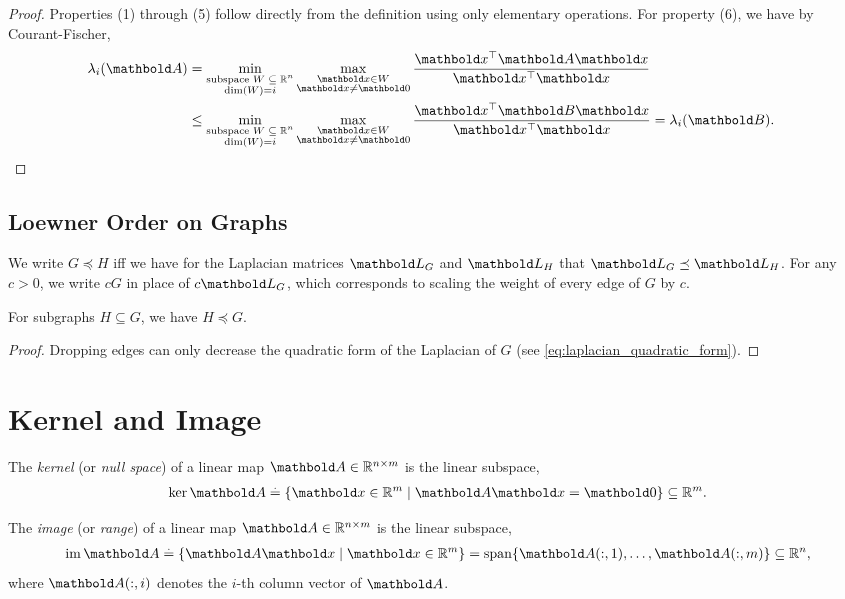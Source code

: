 \begin{proof} Properties (1) through (5) follow directly from the definition using only elementary operations. For property (6), we have by Courant-Fischer, \begin{align*}
    \lambda_i(\mA) &= \min_{\substack{\text{subspace $\sW \subseteq \R^n$} \\ \dim(\sW) = i}} \max_{\substack{\vx \in \sW \\ \vx \neq \vZero}} \frac{\trans{\vx}\mA\vx}{\trans{\vx}\vx} \\
    &\leq \min_{\substack{\text{subspace $\sW \subseteq \R^n$} \\ \dim(\sW) = i}} \max_{\substack{\vx \in \sW \\ \vx \neq \vZero}} \frac{\trans{\vx}\mB\vx}{\trans{\vx}\vx} = \lambda_i(\mB). &\qedhere
\end{align*}
\end{proof}

\subsection{Loewner Order on Graphs}

\begin{defn} We write $G \preceq H$ iff we have for the Laplacian matrices $\mL_G$ and $\mL_H$ that $\mL_G \preceq \mL_H$. For any $c > 0$, we write $c G$ in place of $c \mL_G$, which corresponds to scaling the weight of every edge of $G$ by $c$.
\end{defn}
\begin{lem} For subgraphs $H \subseteq G$, we have $H \preceq G$.
\end{lem}
\begin{proof} Dropping edges can only decrease the quadratic form of the Laplacian of $G$ (see \cref{eq:laplacian_quadratic_form}).
\end{proof}

\section{Kernel and Image}

\begin{defn}[Kernel] The \emph{kernel} (or \emph{null space}) of a linear map $\mA \in \R^{n \times m}$ is the linear subspace, \begin{align}
    \ker\mA \defeq \{\vx \in \R^m \mid \mA\vx = \vZero\}\subseteq \R^m.
\end{align}
\end{defn}
\begin{defn}[Image] The \emph{image} (or \emph{range}) of a linear map $\mA \in \R^{n \times m}$ is the linear subspace, \begin{align}
    \im\mA \defeq \{\mA\vx \mid \vx \in \R^m\} = \vspan\{\mA(:,1), \dots, \mA(:,m)\} \subseteq \R^n,
\end{align} where $\mA(:,i)$ denotes the $i$-th column vector of $\mA$.
\end{defn}

